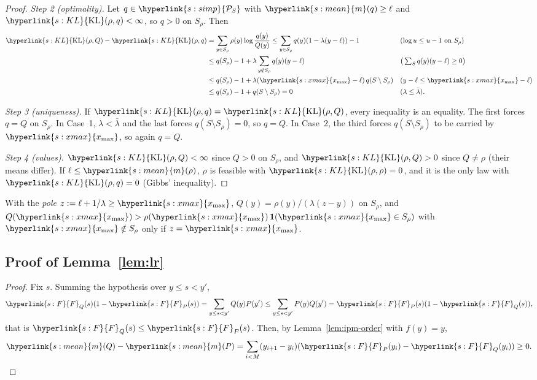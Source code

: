 \documentclass[11pt]{article}
\newcommand{\ind}{\mathbf{1}}
\newcommand{\sy}[2]{{\hyperlink{#1}{#2}}}
\newcommand{\xmax}{\sy{s:xmax}{x_{\max}}}
\newcommand{\Simp}{\sy{s:simp}{\mathcal{P}_{S}}}
\newcommand{\mean}{\sy{s:mean}{m}}
\newcommand{\Fd}{\sy{s:F}{F}}
\newcommand{\KL}{\sy{s:KL}{\mathrm{KL}}}
\begin{document}
\begin{proof}
\emph{Step 2 (optimality).} Let $q\in\Simp$ with $\mean(q)\ge\ell$ and $\KL(\rho,q)<\infty$, so $q>0$ on
$S_\rho$. Then
\begin{align*}
\KL(\rho,Q)-\KL(\rho,q)&=\sum_{y\in S_\rho}\rho(y)\log\frac{q(y)}{Q(y)}
\le\sum_{y\in S_\rho}q(y)(1-\lambda(y-\ell))-1 && (\log u\le u-1\text{ on }S_\rho)\\
&\le q(S_\rho)-1+\lambda\sum_{y\notin S_\rho}q(y)(y-\ell) && \big(\textstyle\sum_Sq(y)(y-\ell)\ge0\big)\\
&\le q(S_\rho)-1+\lambda(\xmax-\ell)\,q(S\setminus S_\rho) && (y-\ell\le\xmax-\ell)\\
&\le q(S_\rho)-1+q(S\setminus S_\rho)=0 && (\lambda\le\bar\lambda).
\end{align*}

\emph{Step 3 (uniqueness).} If $\KL(\rho,q)=\KL(\rho,Q)$, every inequality is an equality. The first
forces $q=Q$ on $S_\rho$. In Case~1, $\lambda<\bar\lambda$ and the last forces
$q(S\setminus S_\rho)=0$, so $q=Q$. In Case~2, the third forces $q(S\setminus S_\rho)$ to be carried
by $\xmax$, so again $q=Q$.

\emph{Step 4 (values).} $\KL(\rho,Q)<\infty$ since $Q>0$ on $S_\rho$, and $\KL(\rho,Q)>0$ since
$Q\ne\rho$ (their means differ). If $\ell\le \mean(\rho)$, $\rho$ is feasible with $\KL(\rho,\rho)=0$,
and it is the only law with $\KL(\rho,q)=0$ (Gibbs' inequality).
\end{proof}

With the \emph{pole} $z:=\ell+1/\lambda\ge\xmax$, $Q(y)=\rho(y)/(\lambda(z-y))$ on $S_\rho$, and
$Q(\xmax)>\rho(\xmax)\,\ind(\xmax\in S_\rho)$ with $\xmax\notin S_\rho$ only if $z=\xmax$.

\subsection{Proof of Lemma~\ref{lem:lr}}\label{sec:proof-lem-lr}

\begin{proof}
Fix $s$. Summing the hypothesis over $y\le s<y'$,
\begin{equation*}
\Fd_Q(s)(1-\Fd_P(s))=\sum_{y\le s<y'}Q(y)P(y')\le\sum_{y\le s<y'}P(y)Q(y')=\Fd_P(s)(1-\Fd_Q(s)),
\end{equation*}
that is $\Fd_Q(s)\le \Fd_P(s)$. Then, by Lemma~\ref{lem:ipm-order} with $f(y)=y$,
\begin{equation*}
\mean(Q)-\mean(P)=\sum_{i<M}(y_{i+1}-y_i)(\Fd_P(y_i)-\Fd_Q(y_i))\ge0.\qedhere
\end{equation*}
\end{proof}
\end{document}
